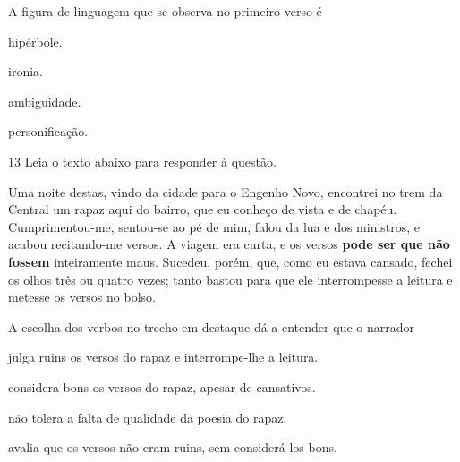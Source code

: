 A figura de linguagem que se observa no primeiro verso é

\begin{escolha}

    \item hipérbole. 

    \item ironia. 

    \item ambiguidade. 

    \item personificação. 

\end{escolha}

\num{13} Leia o texto abaixo para responder à questão. 

\begin{myquote}

Uma noite destas, vindo da cidade para o Engenho
Novo, encontrei no trem da Central um rapaz aqui do
bairro, que eu conheço de vista e de chapéu. 
Cumprimentou-me, sentou-se ao pé de mim, falou da lua
e dos ministros, e acabou recitando-me versos. A viagem 
era curta, e os versos \textbf{pode ser que não fossem} 
inteiramente maus. Sucedeu, porém, que, como eu estava 
cansado, fechei os olhos três ou quatro vezes; tanto 
bastou para que ele interrompesse a leitura e metesse 
os versos no bolso.


\end{myquote}

A escolha dos verbos no trecho em destaque dá a entender que o narrador

\begin{escolha}

  \item julga ruins os versos do rapaz e interrompe-lhe a leitura.

  \item considera bons os versos do rapaz, apesar de cansativos.

  \item não tolera a falta de qualidade da poesia do rapaz.

  \item avalia que os versos não eram ruins, sem considerá-los bons.

\end{escolha}

